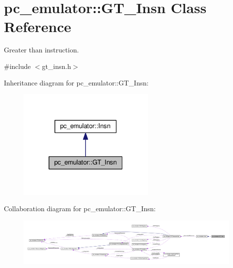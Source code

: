 \hypertarget{classpc__emulator_1_1GT__Insn}{}\section{pc\+\_\+emulator\+:\+:G\+T\+\_\+\+Insn Class Reference}
\label{classpc__emulator_1_1GT__Insn}


Greater than instruction.  




{\ttfamily \#include $<$gt\+\_\+insn.\+h$>$}



Inheritance diagram for pc\+\_\+emulator\+:\+:G\+T\+\_\+\+Insn\+:
\nopagebreak
\begin{figure}[H]
\begin{center}
\leavevmode
\includegraphics[width=193pt]{classpc__emulator_1_1GT__Insn__inherit__graph}
\end{center}
\end{figure}


Collaboration diagram for pc\+\_\+emulator\+:\+:G\+T\+\_\+\+Insn\+:
\nopagebreak
\begin{figure}[H]
\begin{center}
\leavevmode
\includegraphics[width=350pt]{classpc__emulator_1_1GT__Insn__coll__graph}
\end{center}
\end{figure}
